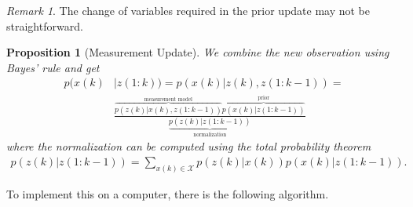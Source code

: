 \documentclass[]{hsrzf}
\theoremstyle{plain}
\newtheorem{prop}{Proposition}[section]
\theoremstyle{definition}
\theoremstyle{remark}
\newtheorem*{remark}{Remark}
\begin{document}
\begin{remark}
  The change of variables required in the prior update may not be
  straightforward.
\end{remark}

\begin{prop}[Measurement Update]
  \label{pro:measurement-update}
  We combine the new observation using Bayes' rule and get
  \begin{align*}
    p(x(k) &| z(1:k)) = p(x(k) | z(k), z(1:k-1)) = \\
      &\frac{
        \overbrace{p(z(k) | x(k), z(1:k-1))}^{\text{measurement model}}
        \overbrace{p(x(k) | z(1:k-1))}^{\text{prior}}
      }{\underbrace{p(z(k) | z(1:k-1))}_\text{normalization}}
  \end{align*}
  where the normalization can be computed using the total probability theorem
  \begin{align*}
    p(z(k) | z(1:k-1)) =
      \sum_{x(k) \in \mathcal{X}} p(z(k) | x(k)) p(x(k) | z(1: k-1)).
  \end{align*}
\end{prop}

To implement this on a computer, there is the following algorithm.
\end{document}
